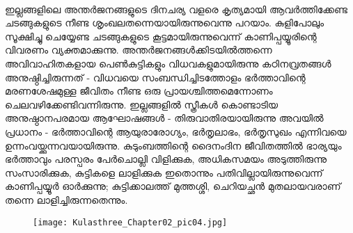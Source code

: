 \paragraph{}ഇല്ലങ്ങളിലെ അന്തർജനങ്ങളുടെ ദിനചര്യ വളരെ കൃത്യമായി ആവർത്തിക്കേണ്ട ചടങ്ങുകളുടെ നീണ്ട ശൃംഖലതന്നെയായിരുന്നുവെന്നു പറയാം. കുളിപോലും സൂക്ഷിച്ചു ചെയ്യേണ്ട ചടങ്ങുകളുടെ കൂട്ടമായിരുന്നുവെന്ന് കാണിപ്പയ്യൂരിന്റെ വിവരണം വ്യക്തമാക്കുന്നു. അന്തർജനങ്ങൾക്കിടയിൽത്തന്നെ അവിവാഹിതകളായ പെൺകുട്ടികളും വിധവകളുമായിരുന്നു കഠിനവ്രതങ്ങൾ അനുഷ്ഠിച്ചിരുന്നത് - വിധവയെ സംബന്ധിച്ചിടത്തോളം ഭർത്താവിന്റെ മരണശേഷമുള്ള ജീവിതം നീണ്ട ഒരു പ്രായശ്ചിത്തമെന്നോണം ചെലവഴിക്കേണ്ടിവന്നിരുന്നു. ഇല്ലങ്ങളിൽ സ്ത്രീകൾ കൊണ്ടാടിയ അനുഷ്ഠാനപരമായ ആഘോഷങ്ങൾ - തിരുവാതിരയായിരുന്നു അവയിൽ പ്രധാനം - ഭർത്താവിന്റെ ആയുരാരോഗ്യം, ഭർതൃലാഭം, ഭർതൃസുഖം എന്നിവയെ ഉന്നംവയ്ക്കുന്നവയായിരുന്നു. കുടുംബത്തിന്റെ ദൈനംദിന ജീവിതത്തിൽ ഭാര്യയും ഭർത്താവും പരസ്പരം പേർചൊല്ലി വിളിക്കുക, അധികസമയം അടുത്തിരുന്നു സംസാരിക്കുക, കുട്ടികളെ ലാളിക്കുക ഇതൊന്നും പതിവില്ലായിരുന്നുവെന്ന് കാണിപ്പയ്യൂർ ഓർക്കുന്നു; കുട്ടിക്കാലത്ത് മുത്തശ്ശി, ചെറിയച്ഛൻ മുതലായവരാണ് തന്നെ ലാളിച്ചിരുന്നതെന്നും. 
\begin{figure}[h]
\begin{center}
\texttt{[image: Kulasthree\_Chapter02\_pic04.jpg]}
\end{center}
\end{figure}

